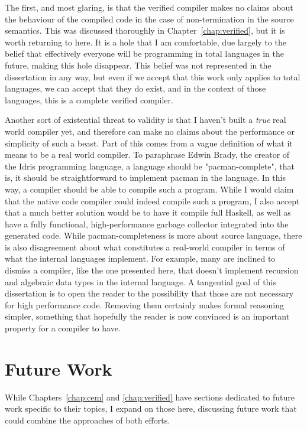 The first, and most glaring, is that the verified compiler makes no claims about
the behaviour of the compiled code in the case of non-termination in the source
semantics. This was discussed thoroughly in Chapter~\ref{chap:verified}, but
it is worth returning to here. It is a hole that I am comfortable, due largely
to the belief that effectively everyone will be programming in total languages
in the future, making this hole disappear. This belief was not represented in
the dissertation in any way, but even if we accept that this work only applies
to total languages, we can accept that they do exist, and in the context of
those languages, this is a complete verified compiler. 

Another sort of existential threat to validity is that I haven't built a
\emph{true} real world compiler yet, and therefore can make no claims about the
performance or simplicity of such a beast. Part of this comes from a vague
definition of what it means to be a real world compiler. To paraphrase Edwin
Brady, the creator of the Idris programming language, a language should be
"pacman-complete", that is, it should be straightforward to implement pacman in
the language. In this way, a compiler should be able to compile such a program.
While I would claim that the native code compiler could indeed compile such a
program, I also accept that a much better solution would be to have it compile
full Haskell, as well as have a fully functional, high-performance garbage
collector integrated into the generated code. While pacman-completeness is more
about source language, there is also disagreement about what constitutes a
real-world compiler in terms of what the internal languages implement. For
example, many are inclined to dismiss a compiler, like the one presented here,
that doesn't implement recursion and algebraic data types in the internal
language. A tangential goal of this dissertation is to open the reader to the
possibility that those are not necessary for high performance code. Removing
them certainly makes formal reasoning simpler, something that hopefully the
reader is now convinced is an important property for a compiler to have.  

\section{Future Work}\label{sec:future}

While Chapters~\ref{chap:cem} and \ref{chap:verified} have sections dedicated to
future work specific to their topics, I expand on those here, discussing future
work that could combine the approaches of both efforts. 

